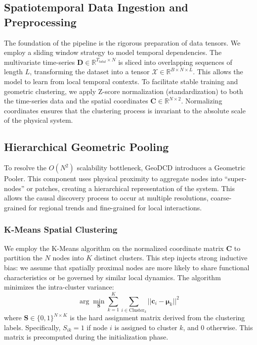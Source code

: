 \documentclass{article}
\begin{document}
\subsection{Spatiotemporal Data Ingestion and Preprocessing}
The foundation of the pipeline is the rigorous preparation of data tensors. We employ a sliding window strategy to model temporal dependencies. The multivariate time-series $\mathbf{D} \in \mathbb{R}^{T_{total} \times N}$ is sliced into overlapping sequences of length $L$, transforming the dataset into a tensor $\mathcal{X} \in \mathbb{R}^{B \times N \times L}$. This allows the model to learn from local temporal contexts.
To facilitate stable training and geometric clustering, we apply Z-score normalization (standardization) to both the time-series data and the spatial coordinates $\mathbf{C} \in \mathbb{R}^{N \times 2}$. Normalizing coordinates ensures that the clustering process is invariant to the absolute scale of the physical system.

\subsection{Hierarchical Geometric Pooling}
To resolve the $O(N^2)$ scalability bottleneck, GeoDCD introduces a Geometric Pooler. This component uses physical proximity to aggregate nodes into ``super-nodes'' or patches, creating a hierarchical representation of the system. This allows the causal discovery process to occur at multiple resolutions, coarse-grained for regional trends and fine-grained for local interactions.

\subsubsection{K-Means Spatial Clustering}
We employ the K-Means algorithm on the normalized coordinate matrix $\mathbf{C}$ to partition the $N$ nodes into $K$ distinct clusters. This step injects strong inductive bias: we assume that spatially proximal nodes are more likely to share functional characteristics or be governed by similar local dynamics.
The algorithm minimizes the intra-cluster variance:
\begin{equation}
\arg \min_{\mathbf{S}} \sum_{k=1}^K \sum_{i \in \text{Cluster}_k} || \mathbf{c}_i - \mathbf{\mu}_k ||^2
\end{equation}
where $\mathbf{S} \in \{0, 1\}^{N \times K}$ is the hard assignment matrix derived from the clustering labels. Specifically, $S_{ik} = 1$ if node $i$ is assigned to cluster $k$, and 0 otherwise. This matrix is precomputed during the initialization phase.
\end{document}
